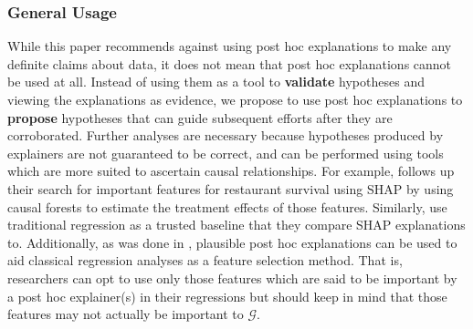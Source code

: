 \documentclass[mnsc,blindrev]{informs3}
\newcommand{\tw}[1]{\textcolor{red}{Tong: #1}}
\begin{document}
    \subsubsection{General Usage}
      While this paper recommends against using post hoc explanations to make any definite claims about data, it does not mean that post hoc explanations cannot be used at all. Instead of using them as a tool to \textbf{validate} hypotheses and viewing the explanations as evidence, we propose to use post hoc explanations to \textbf{propose} hypotheses that can guide subsequent efforts after they are corroborated.  %
     Further analyses are necessary because hypotheses produced by explainers are not guaranteed to be correct, and can be performed using tools which are more suited to ascertain causal relationships. For example,  \cite{zhang2023can} follows up their search for important features for restaurant survival using SHAP by using causal forests to estimate the treatment effects of those features. Similarly, \cite{hanauer22boosting} use traditional regression as a trusted baseline that they compare SHAP explanations to. 
      Additionally, as was done in \cite{tang2024china}, plausible post hoc explanations can be used to aid classical regression analyses as a feature selection method. That is, researchers can opt to use only those features which are said to be important by a post hoc explainer(s) in their regressions but should keep in mind that those features may not actually be important to $\mathcal{G}$. 
    
\end{document}
